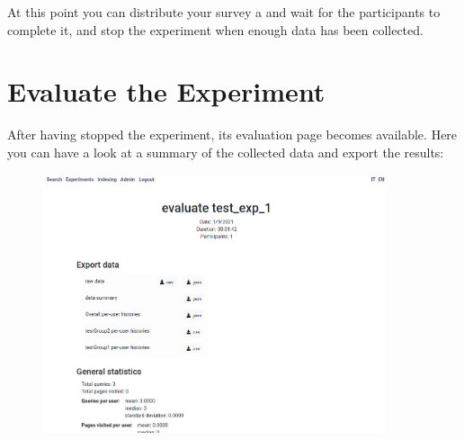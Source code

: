 \documentclass[fleqn]{article}
\begin{document}
At this point you can distribute your survey a and wait for the participants to complete it, and stop the experiment
when enough data has been collected.

\newpage

\section{Evaluate the Experiment}

After having stopped the experiment, its evaluation page becomes available. Here you can have a look at a summary
of the collected data and export the results:

\begin{figure}[h!]
\centering
\includegraphics[width=0.9\textwidth]{img/expEval}
\end{figure}
 
\end{document}
